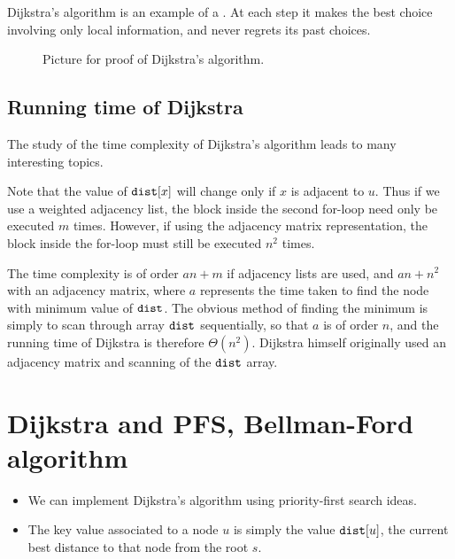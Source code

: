 Dijkstra's algorithm is an example of a . 
At each step it makes the best choice involving only local information,
and never regrets its past choices. 


\begin{figure}
\caption{Picture for proof of Dijkstra's algorithm.}
\label{fig:dijk-proof2}
\end{figure}

\section{Running time of Dijkstra}

The study of the time complexity of Dijkstra's algorithm leads to many
interesting topics.

Note that the value of $\dist[x]$ will change only if $x$ is adjacent to
$u$. Thus if we use a weighted adjacency list, the block inside the
second for-loop need only be executed $m$ times. However, if
using the adjacency matrix representation, the block inside the for-loop
must still be executed $n^2$ times.

The time complexity is of order $a n + m$ if adjacency lists are used,
and $a n + n^2$ with an adjacency matrix, where $a$ represents the time
taken to find the node with minimum value of $\dist$. The obvious method
of finding the minimum is simply to scan through array $\dist$
sequentially, so that $a$ is of order $n$, and the running time of
Dijkstra is therefore $\Theta(n^2)$. Dijkstra himself originally used
an adjacency matrix and scanning of the $\dist$ array. 


\chapter{Dijkstra and PFS, Bellman-Ford algorithm}

\begin{itemize}
\item We can implement Dijkstra's algorithm using priority-first search ideas. 
\item The key value associated to a node $u$ is simply the
value $\dist[u]$, the current best distance to that node from the root $s$.
\end{itemize}

